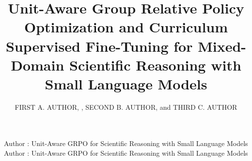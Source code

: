 \documentclass{ieeeaccess}
\begin{document}

\title{Unit-Aware Group Relative Policy Optimization and Curriculum
       Supervised Fine-Tuning for Mixed-Domain Scientific Reasoning
       with Small Language Models}

\author{\uppercase{First A. Author},
,
\uppercase{Second B. Author}, and
\uppercase{Third C. Author}}

\address[1]{Department of Computer Science, [TODO: University Name],
[TODO: City, Country] (e-mail: [TODO: author@institution.edu])}
\address[2]{Department of Artificial Intelligence, [TODO: University Name],
[TODO: City, Country] (e-mail: [TODO: author@institution.edu])}
\address[3]{[TODO: Department, University, City, Country]}


\markboth
{Author \headeretal: Unit-Aware GRPO for Scientific Reasoning with Small Language Models}
{Author \headeretal: Unit-Aware GRPO for Scientific Reasoning with Small Language Models}

\end{document}
